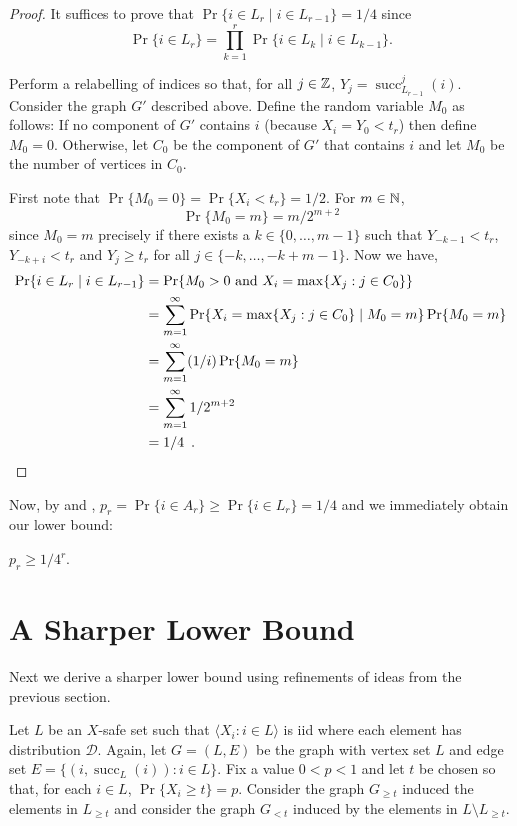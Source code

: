 \documentclass{patmorin}
\DeclareMathOperator{\cw}{succ}
\begin{document}
\begin{proof}
   It suffices to prove that $\Pr\{i\in L_r \mid i\in L_{r-1}\} = 1/4$
   since \[ \Pr\{i\in L_r\} = \prod_{k=1}^r \Pr\{i\in L_k\mid i\in L_{k-1}\} .\]

   Perform a relabelling of indices so that, for all $j\in\mathbb{Z}$,
   $Y_j=\cw^j_{L_{r-1}}(i)$. Consider the graph $G'$ described above.
   Define the random variable $M_0$ as follows:  If no component of $G'$
   contains $i$ (because $X_i=Y_0<t_r$) then define $M_0=0$.  Otherwise,
   let $C_0$ be the component of $G'$ that contains $i$ and let $M_0$
   be the number of vertices in $C_0$.

   First note that $\Pr\{M_0=0\}=\Pr\{X_i<t_r\}=1/2$.
   For $m \in \mathbb{N}$, 
   \[
       \Pr\{M_0=m\} = m/2^{m+2}
   \]
   since $M_0=m$ precisely if there exists a $k\in\{0,\ldots,m-1\}$
   such that $Y_{-k-1}< t_r$, $Y_{-k+i}<t_r$ and $Y_j \ge t_r$ for all
   $j\in\{-k,\ldots,-k+m-1\}$.  Now we have,
   \begin{align*}
      \Pr\{i\in L_r\mid i\in L_{r-1}\} 
          & = \Pr\{\mbox{$M_0>0$ and $X_i=\max\{X_j:j\in C_0\}$}\} \\
          & = \sum_{m=1}^\infty \Pr\{X_i=\max\{X_j:j\in C_0\}\mid M_0=m\}\Pr\{M_0=m\} \\ 
          & = \sum_{m=1}^\infty (1/i)\Pr\{M_0=m\} \\
          & = \sum_{m=1}^\infty 1/2^{m+2} \\
          & = 1/4 \enspace . \qedhere
   \end{align*}
\end{proof}


Now, by  and , $p_r=\Pr\{i\in
A_r\} \ge \Pr\{i\in L_r\}=1/4$ and we immediately obtain our lower bound:
\begin{cor}
   $p_r \ge 1/4^r$.
\end{cor}


\section{A Sharper Lower Bound}

Next we derive a sharper lower bound using refinements of ideas
from the previous section.

Let $L$ be an $X$-safe set such that $\langle X_i: i\in L\rangle$ is iid where
each element has distribution $\mathcal{D}$.  Again, let $G=(L,E)$ be the
graph with vertex set $L$ and edge set $E=\{(i,\cw_L(i)): i\in L\}$.
Fix a value $0<p<1$ and let $t$ be chosen so that, for each $i\in L$,
$\Pr\{X_i\ge t\} = p$.  Consider the graph $G_{\ge t}$ induced the
elements in $L_{\ge t}$ and consider the graph $G_{<t}$ induced by the
elements in $L\setminus L_{\ge t}$.
\end{document}
